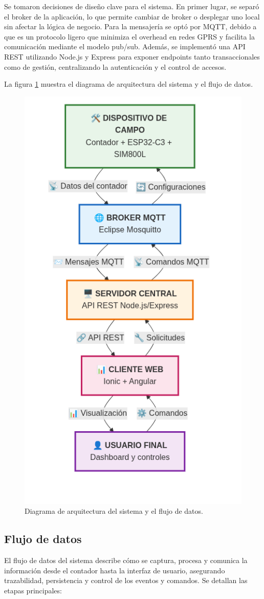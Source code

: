 Se tomaron decisiones de diseño clave para el sistema. En primer lugar, se separó el broker de la aplicación, lo que permite cambiar de broker o desplegar uno local sin afectar la lógica de negocio. Para la mensajería se optó por MQTT, debido a que es un protocolo ligero que minimiza el overhead en redes GPRS y facilita la comunicación mediante el modelo pub/sub. Además, se implementó una API REST utilizando Node.js y Express para exponer endpoints tanto transaccionales como de gestión, centralizando la autenticación y el control de accesos.


La figura \ref{fig:diag_arquitectura} muestra el diagrama de arquitectura del sistema y el flujo de datos.


\begin{figure}[H]
  \centering
  \includegraphics[width=0.5\linewidth]{./Figures/diagArq.png}
  \caption{Diagrama de arquitectura del sistema y el flujo de datos.}
  \label{fig:diag_arquitectura}
\end{figure}



\subsection{Flujo de datos} 
El flujo de datos del sistema describe cómo se captura, procesa y comunica la información desde el contador hasta la interfaz de usuario, asegurando trazabilidad, persistencia y control de los eventos y comandos. Se detallan las etapas principales:

